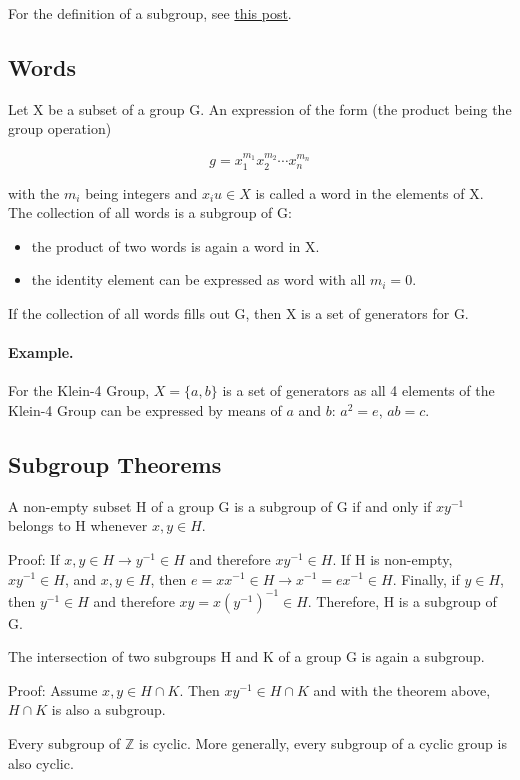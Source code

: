 
For the definition of a subgroup, see
\href{\%7Bfilename\%7D2016-03-02_-groups_01.markdown}{this post}.

\subsection{Words}\label{words}

Let X be a subset of a group G. An expression of the form (the product
being the group operation)

\[
g = x_1^{m_1} x_2^{m_2} \cdots x_n^{m_n}
\]

with the \(m_i\) being integers and \(x_iu \in X\) is called a word in
the elements of X. The collection of all words is a subgroup of G:

\begin{itemize}
\item
  the product of two words is again a word in X.
\item
  the identity element can be expressed as word with all \(m_i = 0\).
\end{itemize}

If the collection of all words fills out G, then X is a set of
generators for G.

\paragraph{Example.}

For the Klein-4 Group, \(X = \{a,b\}\) is a set of generators as all 4
elements of the Klein-4 Group can be expressed by means of \(a\) and
\(b\): \(a^2 = e\), \(ab = c\).

\subsection{Subgroup Theorems}\label{subgroup-theorems}

A non-empty subset H of a group G is a subgroup of G if and only if
\(xy^{-1}\) belongs to H whenever \(x,y \in H\).

Proof: If \(x, y \in H \rightarrow y^{-1} \in H\) and therefore
\(x y^{-1} \in H\). If H is non-empty, \(x y^{-1} \in H\), and
\(x,y \in H\), then
\(e = x x^{-1} \in H \rightarrow x^{-1} = ex^{-1} \in H\). Finally, if
\(y \in H\), then \(y^{-1} \in H\) and therefore
\(xy = x (y^{-1})^{-1} \in H\). Therefore, H is a subgroup of G.

The intersection of two subgroups H and K of a group G is again a
subgroup.

Proof: Assume \(x,y \in H \cap K\). Then \(xy^{-1} \in H \cap K\) and
with the theorem above, $H \cap K$ is also a subgroup.

Every subgroup of \(\mathbb{Z}\) is cyclic. More generally, every
subgroup of a cyclic group is also cyclic.
